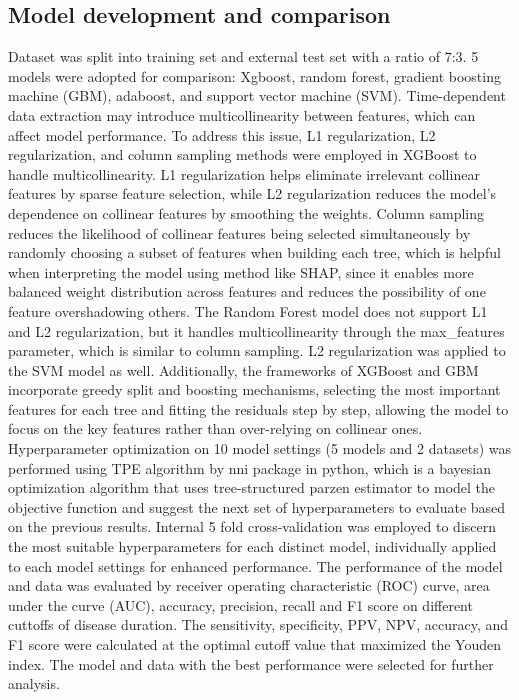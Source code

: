 \documentclass[final,3p,times,authoryear]{elsarticle}
\begin{document}
\subsection{Model development and comparison}\label{Training}
Dataset was split into training set and external test set with a ratio of 7:3. 5 models were adopted for comparison: Xgboost, random forest, gradient boosting machine (GBM), adaboost, and support vector machine (SVM). 
Time-dependent data extraction may introduce multicollinearity between features, which can affect model performance. To address this issue, L1 regularization, L2 regularization, and column sampling methods were employed in XGBoost to handle multicollinearity. L1 regularization helps eliminate irrelevant collinear features by sparse feature selection, while L2 regularization reduces the model's dependence on collinear features by smoothing the weights. Column sampling reduces the likelihood of collinear features being selected simultaneously by randomly choosing a subset of features when building each tree, which is helpful when interpreting the model using method like SHAP, since it enables more balanced weight distribution across features and reduces the possibility of one feature overshadowing others. The Random Forest model does not support L1 and L2 regularization, but it handles multicollinearity through the max\_features parameter, which is similar to column sampling. L2 regularization was applied to the SVM model as well. Additionally, the frameworks of XGBoost and GBM incorporate greedy split and boosting mechanisms, selecting the most important features for each tree and fitting the residuals step by step, allowing the model to focus on the key features rather than over-relying on collinear ones. 
Hyperparameter optimization on 10 model settings (5 models and 2 datasets) was performed using TPE algorithm by nni package in python, which is a bayesian optimization algorithm that uses tree-structured parzen estimator to model the objective function and suggest the next set of hyperparameters to evaluate based on the previous results. Internal 5 fold cross-validation was employed to discern the most suitable hyperparameters for each distinct model, individually applied to each model settings for enhanced performance. The performance of the model and data was evaluated by receiver operating characteristic (ROC) curve, area under the curve (AUC), accuracy, precision, recall and F1 score on different cuttoffs of disease duration. The sensitivity, specificity, PPV, NPV, accuracy, and F1 score were calculated at the optimal cutoff value that maximized the Youden index. The model and data with the best performance were selected for further analysis.
\end{document}

